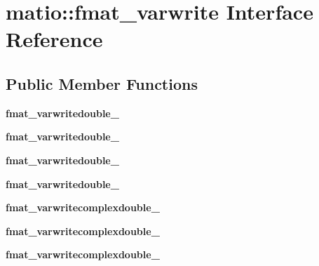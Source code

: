 \hypertarget{interfacematio_1_1fmat__varwrite}{}\section{matio\+:\+:fmat\+\_\+varwrite Interface Reference}
\label{interfacematio_1_1fmat__varwrite}
\subsection*{Public Member Functions}
\begin{DoxyCompactItemize}
\item 
\mbox{\label{interfacematio_1_1fmat__varwrite_a28f20c9fa075f299c8e0250040c31b92}} 
{\bfseries fmat\+\_\+varwritedouble\+\_}
\item 
\mbox{\label{interfacematio_1_1fmat__varwrite_a254aff938808b29b959c0b574c9436fe}} 
{\bfseries fmat\+\_\+varwritedouble\+\_}
\item 
\mbox{\label{interfacematio_1_1fmat__varwrite_a9c1f10ee509a1ee1185f15179d36496b}} 
{\bfseries fmat\+\_\+varwritedouble\+\_}
\item 
\mbox{\label{interfacematio_1_1fmat__varwrite_aa7f442dcc534235f8aac1d25f9919695}} 
{\bfseries fmat\+\_\+varwritedouble\+\_}
\item 
\mbox{\label{interfacematio_1_1fmat__varwrite_a57f3ad8baa197a390f0071d7f4a7b738}} 
{\bfseries fmat\+\_\+varwritecomplexdouble\+\_}
\item 
\mbox{\label{interfacematio_1_1fmat__varwrite_aec2587c4aaddc3c278ced414ef42aee1}} 
{\bfseries fmat\+\_\+varwritecomplexdouble\+\_}
\item 
\mbox{\label{interfacematio_1_1fmat__varwrite_a1f1239548801efcb63b5b5db692d7581}} 
{\bfseries fmat\+\_\+varwritecomplexdouble\+\_}
\item 
\mbox{\label{interfacematio_1_1fmat__varwrite_aead79139dad2289353fcee54c6bc5c9c}} 

\end{DoxyCompactItemize}
